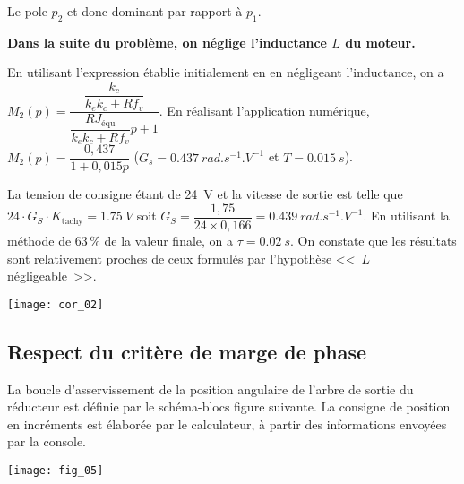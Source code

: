 \begin{multicols}{2}
\begin{corrige}
Le pole $p_2$ et donc dominant par rapport à $p_1$.
\end{corrige}
\else
\fi

\ifprof
\else
\textbf{Dans la suite du problème, on néglige l’inductance $L$ du moteur.}
\fi

\ifprof
\begin{corrige}
En utilisant l'expression établie initialement en en négligeant l'inductance, on a 
$  M_2(p)=\dfrac{\dfrac{k_c}{k_e k_c+Rf_v}}{  \dfrac{ RJ_{\text{équ}}  }{k_e k_c+Rf_v}p +1 }$.
En réalisant l'application numérique, $M_2(p)=\dfrac{0,437}{1+0,015p}$ 
($G_s = \SI{0,437}{rad.s^{-1}.V^{-1}}$ 
et $T=\SI{0,015}{s}$).
\end{corrige}
\else
\fi


\ifprof
\begin{corrige}
La tension de consigne étant de \SI{24}{V} et la vitesse de sortie est telle que  $24\cdot G_S \cdot K_{\text{tachy}}= \SI{1,75}{V}$ soit $G_S = \dfrac{1,75}{24\times 0,166} = \SI{0,439}{rad.s^{-1}.V^{-1}} $. En utilisant la méthode de 63\,\% de la valeur finale, on a $\tau = \SI{0,02}{s}$.
On constate que les résultats sont relativement proches de ceux formulés par l'hypothèse <<~$L$ négligeable~>>.
\end{corrige}
\begin{center}
\texttt{[image: cor\_02]}
\end{center}
\else
\fi

\subsection*{Respect du critère de marge de phase}
\ifprof
\else
La boucle d’asservissement de la position angulaire de l’arbre de sortie du réducteur est définie par le schéma-blocs figure suivante. 
La consigne de position en incréments est élaborée par le  calculateur, à partir des informations envoyées par la console.

\begin{center}
\texttt{[image: fig\_05]}
\end{center}



\end{multicols}
